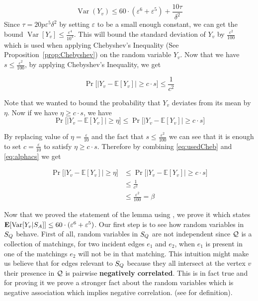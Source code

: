 \documentclass[letterpaper,11pt]{article}
\renewcommand{\epsilon}{\varepsilon}
\DeclareMathOperator{\E}{\ensuremath{\normalfont \textbf{E}}}
\DeclareMathOperator{\var}{Var}
\renewcommand{\epsilon}[0]{\ensuremath{\varepsilon}}
\begin{document}
\begin{equation}
    \var(Y_v) \leq 60 \cdot (\epsilon^{6} + \epsilon^{5}) + \frac{10\tau}{\delta^2} 
\end{equation}
Since $\tau = 20p\epsilon^5 \delta^2$ by setting $\epsilon$ to be a small enough constant, we can get the bound $\var[Y_v] \leq \frac{\epsilon^4}{10^4}$. This will bound the standard deviation of $Y_v$ by $\frac{\epsilon^2}{100}$ which is used when applying Chebyshev's Inequality (See Proposition~\ref{prop:Chebyshev}) on the  random variable $Y_v$. Now that we have $s \leq \frac{\epsilon^2}{100}$, by applying Chebyshev's Inequality, we get

\begin{equation}\label{eq:usedCheb}
    \Pr\Big[|Y_v - \mathbb{E}[Y_v]| \geq c \cdot s \Big] \leq \frac{1}{c^2}
\end{equation}

Note that we wanted to bound the probability that $Y_v$ deviates from its mean by $\eta$. Now if we have $\eta \geq c \cdot s$, we have
\begin{equation}\label{eq:alphacs}
\Pr\Big[|Y_v - \mathbb{E}[Y_v]| \geq \eta \Big] \leq 
\Pr\Big[|Y_v - \mathbb{E}[Y_v]| \geq c \cdot s \Big]
\end{equation}

By replacing value of $\eta = \frac{\epsilon}{10}$ and the fact that $s \leq \frac{\epsilon^2}{100}$ we can see that it is enough to set $c = \frac{\epsilon}{10}$ to satisfy $\eta \geq c \cdot s$. Therefore by combining \eqref{eq:usedCheb} and \eqref{eq:alphacs} we get


\begin{align*}
\Pr\Big[|Y_v - \mathbb{E}[Y_v]| \geq \eta \Big] & \leq 
\Pr\Big[|Y_v - \mathbb{E}[Y_v]| \geq c \cdot s \Big] \\
& \leq \frac{1}{c^2} \\
& \leq \frac{\epsilon^2}{100} = \beta
\end{align*}

Now that we proved the statement of the lemma using , we prove it 
which states
$
\E[\var[Y_v | S_A]] \leq 60 \cdot (\epsilon^{6} + \epsilon^{5})
$.
Our first step is to see how random variables in $S_Q$ behave. First of all, random variables in $S_Q$ are not independent since $\mathcal{Q}$ is a collection of matchings, for two incident edges $e_1$ and $e_2$, when $e_1$ is present in one of the matchings $e_2$ will not be in that matching. This intuition might make us believe that for edges relevant to $S_Q$ because they all intersect at the vertex $v$ their presence in $\mathcal{Q}$ is pairwise \textbf{negatively correlated}. This is in fact true and for proving it we prove a stronger fact about the random variables which is negative association which implies negative correlation. (see  for definition).
\end{document}
